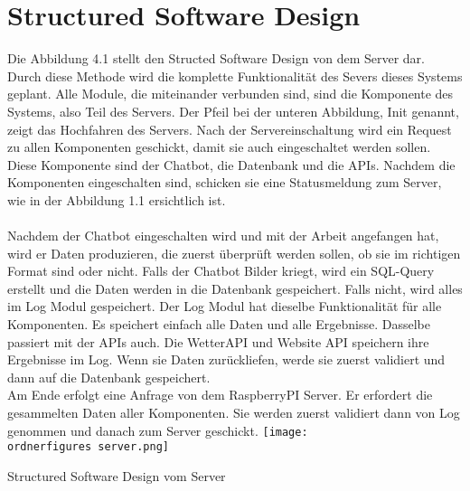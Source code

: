 \section{Structured Software Design}

Die Abbildung 4.1 stellt den Structed Software Design von dem Server dar. Durch diese Methode wird die komplette Funktionalität des Severs dieses Systems geplant. Alle Module, die miteinander verbunden sind, sind die Komponente des Systems, also Teil des Servers. 
Der Pfeil bei der unteren Abbildung, Init genannt, zeigt das Hochfahren des Servers. Nach der Servereinschaltung wird ein Request zu allen Komponenten geschickt, damit sie auch eingeschaltet werden sollen. Diese Komponente sind der Chatbot, die Datenbank und die APIs. 
Nachdem die Komponenten eingeschalten sind, schicken sie eine Statusmeldung zum Server, wie in der Abbildung 1.1 ersichtlich ist. \\
\\
Nachdem der Chatbot eingeschalten wird und mit der Arbeit angefangen hat, wird er Daten produzieren, die zuerst überprüft werden sollen, ob sie im richtigen Format sind oder nicht. Falls der Chatbot Bilder kriegt, wird ein SQL-Query erstellt und die Daten werden in die Datenbank gespeichert. Falls nicht, wird alles im Log Modul gespeichert. Der Log Modul hat dieselbe Funktionalität für alle Komponenten. Es speichert einfach alle Daten und alle Ergebnisse.
Dasselbe passiert mit der APIs auch. Die WetterAPI und Website API speichern ihre Ergebnisse im Log. Wenn sie Daten zurückliefen, werde sie zuerst validiert und dann auf die Datenbank gespeichert.\\

Am Ende erfolgt eine Anfrage von dem RaspberryPI Server. Er erfordert die gesammelten Daten aller Komponenten. Sie werden zuerst validiert dann von Log genommen und danach zum Server geschickt.
\captionsetup{type=figure}
\texttt{[image: \\ordnerfigures server.png]}
\caption{Structured Software Design vom Server}
\label{fig:ersteebene}
